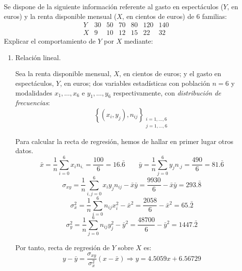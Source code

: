 \begin{ejercicio}\label{ej:2.Ejercicio14}
    Se dispone de la siguiente información referente al gasto en espectáculos ($Y$, en euros) y la renta disponible mensual ($X$, en cientos de euros) de 6 familias:
    \begin{equation*}
        \begin{array}{c|cccccc}
            Y & 30 & 50 & 70 & 80 & 120 & 140 \\ \hline
            X & 9 & 10 & 12 & 15 & 22 & 32
        \end{array}
    \end{equation*}
    Explicar el comportamiento de $Y$ por $X$ mediante:
    \begin{enumerate}
        \item Relación lineal.\label{Ej:Ej14.Ap_A}

        Sea la renta disponible mensual, $X$, en cientos de euros; y el gasto en espectáculos, $Y$, en euros; dos variables estadísticas con población $n=6$ y modalidades $x_1, \dots, x_6$ e $y_1, \dots, y_6$ respectivamente, con \emph{distribución de frecuencias}:
        $$\left\{ (x_i,y_j), n_{ij}\right\}_{\substack{i=1,\dots,6\\j=1,\dots,6}}$$

        Para calcular la recta de regresión, hemos de hallar en primer lugar otros datos.
        \begin{equation*}
            \bar{x} = \frac{1}{n}\sum_{i=0}^6 x_{i}n_{i.} = \frac{100}{6} = 16.\bar{6}
            \qquad
            \bar{y} = \frac{1}{n}\sum_{j=0}^6 y_{j}n_{.j} = \frac{490}{6} = 81.\bar{6}
        \end{equation*}
        \begin{equation*}
            \sigma_{xy} = \frac{1}{n}\sum_{i,j=0}^6 x_iy_j n_{ij} - \bar{x}\bar{y} = \frac{9930}{6} - \bar{x}\bar{y} = 293.\bar{8}
        \end{equation*}
        \begin{equation*}
            \sigma_x^2 = \frac{1}{n}\sum_{i=0}^6 n_{ij}x_i^2 - \bar{x}^2 = \frac{2058}{6} - \bar{x}^2 = 65.\bar{2}
        \end{equation*}
        \begin{equation*}
            \sigma_y^2 = \frac{1}{n}\sum_{j=0}^6 n_{ij}y_j^2 - \bar{y}^2 = \frac{48700}{6} - \bar{y}^2 = 1447.\bar{2}
        \end{equation*}

        Por tanto, recta de regresión de $Y$ sobre $X$ es:
        \begin{equation*}
            y-\bar{y} = \frac{\sigma_{xy}}{\sigma_x^2}(x-\bar{x}) \Longrightarrow y=4.5059x +6.56729
        \end{equation*}
        

\end{enumerate}
\end{ejercicio}
